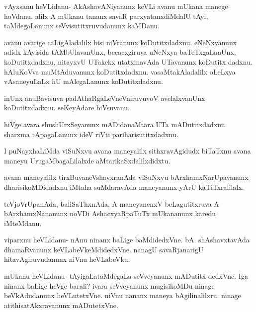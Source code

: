 \documentclass{article}
\begin{document}
\begin{mng}%
vAyxsanu heVLidanu- AkAshavANiyanunx  keVLi avanu mUkana
manege hoVdanu. alilx A mUkanu tananx savaR parxyatanxdiMdalU tAyi,
taMdegaLanunx seVvisutitxruvudanunx kaMDanu.
\end{mng}

\begin{mng}%
avanu avarige caLigAladalilx bisi niVranunx koDutitxdadxnu.
eNeNxyanunx adidx kAyisida tAMbUlavanUnx, becacxgiruva uNeNxya baTeTxgaLanUnx,
koDutitxdadxnu, nitayxvU UTakekx utatxmavAda UTavanunx koDutitx
dadxnu. hAluKoVva muMtAduvanunx koDutitxdadxnu. vasaMtakAladalilx
oLeLxya vAsaneyuLaLx hU mAlegaLanunx koDutitxdadxnu.
\end{mng}

\begin{mng}%
inUnx anuBavisuva padAthaRgaLeVneVniruvuvoV avelalxvanUnx
koDutitxdadxnu. seKeyAdare biVsuvanu.
\end{mng}

\begin{mng}%
hiVge avara shushUrxSeyanunx mADidanaMtara UTa mADutitxdadxnu.
sharxma tApagaLanunx ideV riVti pariharisutitxdadxnu.
\end{mng}

\begin{mng}%
I puNayxhaLiMda viSuNxvu avana maneyalilx sithxravAgidudx biTaTxnu
avana maneyu UrugaMbagaLilalxde aMtarikaSxdalilxdidxtu.
\end{mng}

\begin{mng}%
avana maneyalilx tirxBuvaneVshavxranAda viSuNxvu bArxhamxNarUpavanunx
dharisikoMDidadxnu iMtaha suMdaravAda maneyanunx yArU kaTiTxralilalx.
\end{mng}

\begin{mng}%
teVjoVrUpanAda, baliSaThxnAda, A maneyanenxV beLagutitxruva
A bArxhamxNananunx noVDi AshacxyaRpaTuTx mUkananunx karedu iMteMdanu.
\end{mng}

\begin{mng}%
viparxnu heVLidanu- nAnu ninanx baLige baMdidedxVne. bA. shAshavxtavAda
dhamaRvanunx keVLabeVkeMdidedxVne. nanagU savaRjanarigU hitavAgiruvudanunx
niVnu heVLabeVku.
\end{mng}

\begin{mng}%
mUkanu heVLidanu- tAyigaLataMdegaLa seVveyanunx mADutitx
dedxVne. Iga ninanx baLige heVge barali? ivara seVveyanunx mugisikoMDu
ninage beVkAdudanunx heVLutetxVne. niVnu nananx maneya bAgilinalilxru. ninage
atithisatAkxravanunx mADutetxVne.
\end{mng}
\end{document}
